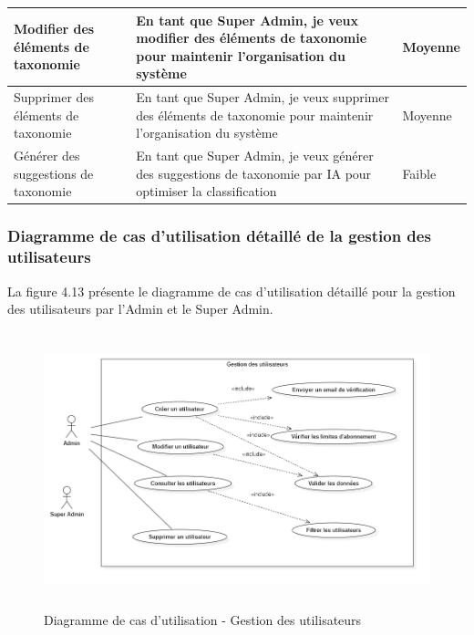 \begin{longtable}{|>{\raggedright\arraybackslash}p{4cm}|>{\raggedright\arraybackslash}p{7cm}|>{\raggedright\arraybackslash}p{2cm}|}
\hline
Modifier des éléments de taxonomie & En tant que Super Admin, je veux modifier des éléments de taxonomie pour maintenir l'organisation du système & Moyenne \\
\hline
Supprimer des éléments de taxonomie & En tant que Super Admin, je veux supprimer des éléments de taxonomie pour maintenir l'organisation du système & Moyenne \\
\hline
Générer des suggestions de taxonomie & En tant que Super Admin, je veux générer des suggestions de taxonomie par IA pour optimiser la classification & Faible \\
\hline
\end{longtable}

\subsubsection{Diagramme de cas d'utilisation détaillé de la gestion des utilisateurs}
\noindent La figure 4.13 présente le diagramme de cas d'utilisation détaillé pour la gestion des utilisateurs par l'Admin et le Super Admin.

\begin{figure}[H]
    \centering
    \includegraphics[width=13cm,height=8cm]{images/gestionuseruc.png}
    \caption{Diagramme de cas d'utilisation - Gestion des utilisateurs}
\end{figure}

